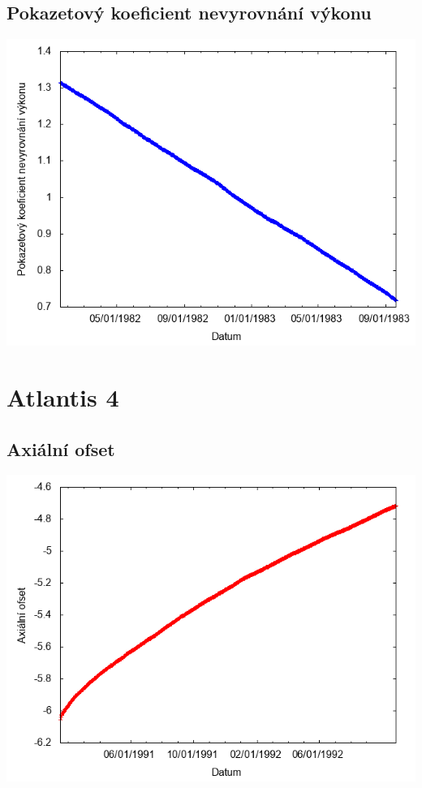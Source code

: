 \documentclass[a4paper,twoside,11pt]{article}
\begin{document}
\subsection*{Pokazetový koeficient nevyrovnání výkonu}
\begin{center}
\includegraphics[width=.8\textwidth]{graphs/Atlantis_03_fha.png}
\end{center}

\newpage
\section*{Atlantis 4}
\subsection*{Axiální ofset}
\begin{center}
\includegraphics[width=.8\textwidth]{graphs/Atlantis_04_ao.png}
\end{center}
\end{document}
